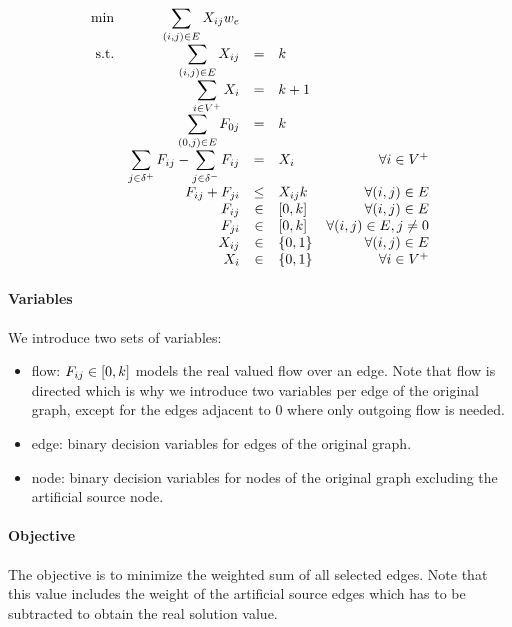 \documentclass{article}
\begin{document}
\begin{equation}
\begin{array}{r r c l r}
\displaystyle \min & \displaystyle \sum_{(i, j) \in E} {X_{ij} w_e} \\
\textrm{s.t.}  

& \displaystyle \sum_{(i, j) \in E} X_{ij} & = & k & \\
& \displaystyle \sum_{i \in V^+} X_{i} & = & k + 1 & \\
& \displaystyle \sum_{(0, j) \in E} F_{0j} & = & k& \\
& \displaystyle \sum_{j \in \delta^+} F_{ij} - \displaystyle \sum_{j \in \delta^-} F_{ij}& = & X_{i} & \forall i \in V^+ \\
& F_{ij} + F_{ji} & \leq & X_{ij} k & \forall (i,j) \in E \\

& F_{ij} & \in & [0, k]  &  \forall (i,j) \in E\\
&F_{ji} & \in & [0, k]  &  \forall (i,j) \in E, j \neq 0\\
& X_{ij} & \in & \{0, 1\}  &  \forall (i,j) \in E\\
& X_{i} & \in & \{0, 1\}  &  \forall i \in V^+\\

\end{array}
\end{equation}

\paragraph{Variables}We introduce two sets of variables:
\begin{itemize}
	\item flow: $F_{ij} \in [0, k]$ models the real valued flow over an edge. Note that flow is directed which is why we introduce two variables per edge of the original graph, except for the edges adjacent to $0$ where only outgoing flow is needed.
	\item edge: binary decision variables for edges of the original graph.
	\item node: binary decision variables for nodes of the original graph excluding the artificial source node. 
\end{itemize}

\paragraph{Objective}The objective is to minimize the weighted sum of all selected edges. Note that this value includes the weight of the artificial source edges which has to be subtracted to obtain the real solution value.
\end{document}
